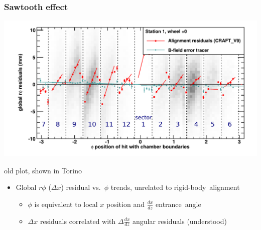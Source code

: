 \documentclass[compress]{beamer}
\begin{document}
\begin{frame}
\frametitle{Sawtooth effect}

\vspace{0.25 cm}
\includegraphics[width=\linewidth]{DTrphiVsPhi_st1_whC.pdf}

\vspace{-0.25 cm}
\hfill {\scriptsize old plot, shown in Torino}

\begin{itemize}
\item Global $r\phi$ ($\Delta x$) residual vs.\ $\phi$ trends, unrelated to \mbox{rigid-body alignment\hspace{-1 cm}}
\begin{itemize}\setlength{\itemsep}{0.1 cm}
\item $\phi$ is equivalent to local $x$ position and $\frac{dx}{dz}$ \mbox{entrance angle\hspace{-1 cm}}
\item $\Delta x$ residuals correlated with $\Delta \frac{dx}{dz}$ angular residuals \mbox{(understood)\hspace{-1 cm}}
\end{itemize}
\end{itemize}
\end{frame}
\end{document}
